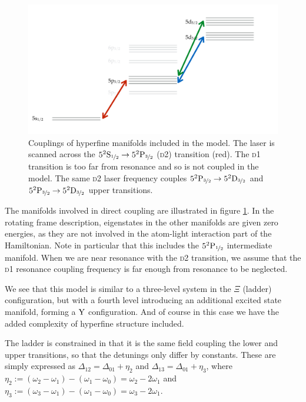     \begin{figure}[]
    \includegraphics[width=\linewidth]
        {figs/05_twophoton/twophoton_level_scheme_coupling.pdf}
    \caption{
    Couplings of hyperfine manifolds included in the model. The laser is scanned
    across the $5^2\rm{S}_{\nicefrac{1}{2}} \rightarrow
    5^2\rm{P}_{\nicefrac{3}{2}}$ (\textsc{d2}) transition (red). The \textsc{d1}
    transition is too far from resonance and so is not coupled in the model. The
    same \textsc{d2} laser frequency couples $5^2\rm{P}_{\nicefrac{3}{2}}
    \rightarrow 5^2\rm{D_{\nicefrac{3}{2}}}$ and $5^2\rm{P}_{\nicefrac{3}{2}}
    \rightarrow 5^2\rm{D_{\nicefrac{3}{2}}}$ upper transitions.
    } 
    \label{fig:twophoton_level_scheme_coupling} 
    \end{figure}

    The manifolds involved in direct coupling are illustrated in figure
    \ref{fig:twophoton_level_scheme_coupling}. In the rotating frame
    description, eigenstates in the other manifolds are given zero energies, as
    they are not involved in the atom-light interaction part of the Hamiltonian.
    Note in particular that this includes the $5^2\rm{P}_{\nicefrac{1}{2}}$
    intermediate manifold. When we are near resonance with the \textsc{d2}
    transition, we assume that the \textsc{d1} resonance coupling frequency is
    far enough from resonance to be neglected.

    We see that this model is similar to a three-level system in the $\Xi$
    (ladder) configuration, but with a fourth level introducing an additional
    excited state manifold, forming a $\rm{Y}$ configuration. And of course in
    this case we have the added complexity of hyperfine structure included.

    The ladder is constrained in that it is the same field coupling the lower
    and upper transitions, so that the detunings only differ by constants. These
    are simply expressed as $\Delta_{12} = \Delta_{01} + \eta_{2}$ and
    $\Delta_{13} = \Delta_{01} + \eta_{3}$, where $\eta_{2} := (\omega_2 -
    \omega_1) - (\omega_1 - \omega_0) = \omega_2 - 2\omega_1$ and $\eta_{3} :=
    (\omega_3 - \omega_1) - (\omega_1 - \omega_0) = \omega_3 - 2\omega_1$.

